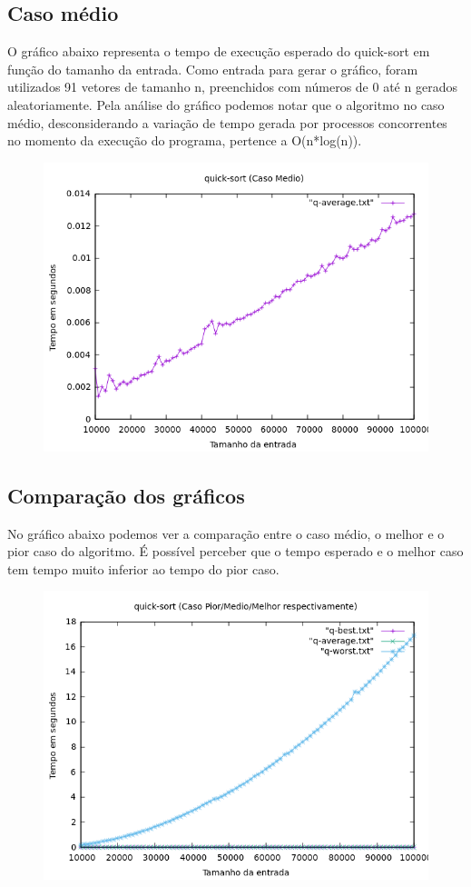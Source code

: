 \subsection{Caso médio}
O gráfico abaixo representa o tempo de execução esperado do quick-sort em função do tamanho da entrada. Como entrada para gerar o gráfico, foram utilizados 91 vetores de tamanho n, preenchidos com números de 0 até n gerados aleatoriamente. Pela análise do gráfico podemos notar que o algoritmo no caso médio, desconsiderando a variação de tempo gerada por processos concorrentes no momento da execução do programa, pertence a O(n*log(n)).
\begin{figure}[h]
    \centering
    \includegraphics[width=1\linewidth]{Imagens/q-average.png}
\end{figure}

\newpage

\subsection{Comparação dos gráficos}
No gráfico abaixo podemos ver a comparação entre o caso médio, o melhor e o pior caso do algoritmo. É possível perceber que o tempo esperado e o melhor caso tem tempo muito inferior ao tempo do pior caso.
\begin{figure}[h]
    \centering
    \includegraphics[width=1\linewidth]{Imagens/q-baw.png}
\end{figure}

